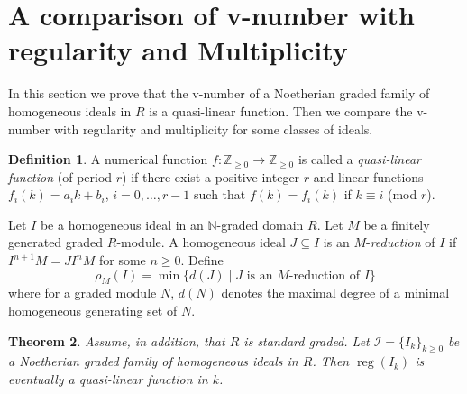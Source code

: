 \documentclass[11pt,reqno,a4paper]{amsart}
\newtheorem{theorem}{Theorem}[section]
\theoremstyle{definition}
\newtheorem{definition}[theorem]{Definition}
\begin{document}
\section{A comparison of v-number with regularity and Multiplicity}\label{section4}






\noindent In this section we prove that  the $\mathrm{v}$-number of a Noetherian graded family of homogeneous ideals in $R$ is a quasi-linear function. Then we compare the \(\mathrm{v}\)-number with regularity and multiplicity for some classes of ideals.


\begin{definition}
    


A numerical function $f:\mathbb{Z}_{\geq 0}\to \mathbb{Z}_{\geq 0}$ is called a \emph{quasi-linear function} (of period $r$) if there exist a positive integer $r$ and linear functions $f_{i}(k) = a_{i}k + b_{i}$, $i = 0,\ldots ,r - 1$ such that $f(k) = f_{i}(k)$ if $k\equiv i$ (mod $r$).

\end{definition}


Let $I$ be a homogeneous ideal in an $\mathbb{N}$-graded domain $R$. Let $M$ be a finitely generated graded $R$-module. A homogeneous ideal $J \subseteq I$ is an $M$-\emph{reduction} of $I$ if $I^{n+1}M = JI^nM$ for some $n \geq 0$. Define
\[\rho_M(I) = \min\{ d(J) \mid J \text{ is an } M\text{-reduction of } I\}\]
where for a graded module $N$, $d(N)$ denotes the maximal degree of a minimal homogeneous generating set of $N$.





\begin{theorem}\label{reg/vnumberisquasilinear}
   Assume, in addition, that $R$ is standard graded. Let $\mathcal{I} = \{ I_k \}_{k \geq 0}$ be a Noetherian graded family of homogeneous ideals in $R$. Then
     $\operatorname{reg}(I_k)$ is eventually a quasi-linear function in $k$.
\end{theorem}
\end{document}

